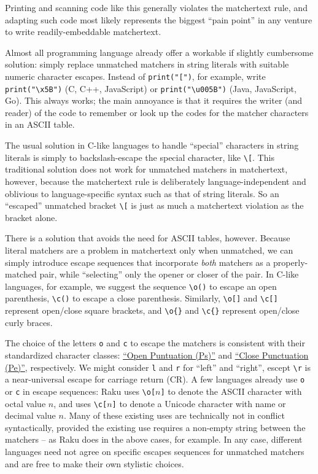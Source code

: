 Printing and scanning code like this generally violates the matchertext rule,
and adapting such code most likely represents the biggest ``pain point''
in any venture to write readily-embeddable matchertext.

Almost all programming language already offer a workable
if slightly cumbersome solution:
simply replace unmatched matchers in string literals
with suitable numeric character escapes.
Instead of \verb|print("[")|, for example,
write \verb|print("\x5B")| (C, C++, JavaScript)
or \verb|print("\u005B")| (Java, JavaScript, Go).
This always works;
the main annoyance is that it requires the writer (and reader) of the code
to remember or look up the codes for the matcher characters in an ASCII table.

The usual solution in C-like languages
to handle ``special'' characters in string literals
is simply to backslash-escape the special character,
like \verb|\[|.
This traditional solution does not work for unmatched matchers in matchertext,
however,
because the matchertext rule is deliberately language-independent
and oblivious to language-specific syntax such as that of string literals.
So an ``escaped'' unmatched bracket \verb|\[|
is just as much a matchertext violation as the bracket alone.

There is a solution that avoids the need for ASCII tables, however.
Because literal matchers are a problem in matchertext only when unmatched,
we can simply introduce escape sequences that incorporate
\emph{both} matchers as a properly-matched pair,
while ``selecting'' only the opener or closer of the pair.
In C-like languages, for example,
we suggest the sequence \verb|\o()| to escape an open parenthesis,
\verb|\c()| to escape a close parenthesis.
Similarly,
\verb|\o[]| and \verb|\c[]| represent open/close square brackets,
and \verb|\o{}| and \verb|\c{}| represent open/close curly braces.

The choice of the letters \verb|o| and \verb|c| to escape the matchers
is consistent with their standardized character classes:
\href{https://www.compart.com/en/unicode/category/Ps}{``Open Puntuation (Ps)''}
and
\href{https://www.compart.com/en/unicode/category/Pe}{``Close Punctuation (Pe)''},
respectively.
We might consider \verb|l| and \verb|r| for ``left'' and ``right'',
escept \verb|\r| is a near-universal escape for carriage return (CR).
A few languages already use \verb|o| or \verb|c| in escape sequences:
\eg Raku uses \verb|\o[|$n$\verb|]|
to denote the ASCII character with octal value $n$,
and uses \verb|\c[|$n$\verb|]|
to denote a Unicode character with name or decimal value $n$.
Many of these existing uses are technically not in conflict syntactically,
provided the existing use requires a non-empty string between the matchers --
as Raku does in the above cases, for example.
In any case, different languages need not agree
on specific escapes sequences for unmatched matchers
and are free to make their own stylistic choices.

